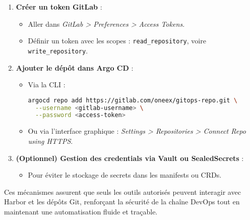 \begin{enumerate}
	\item \textbf{Créer un token GitLab} :
	      \begin{itemize}
		      \item Aller dans \emph{GitLab > Preferences > Access Tokens}.
		      \item Définir un token avec les scopes : \texttt{read\_repository}, voire \texttt{write\_repository}.
	      \end{itemize}


	\item \textbf{Ajouter le dépôt dans Argo CD} :
	      \begin{itemize}
		      \item Via la CLI :
		            \begin{lstlisting}[language=bash]
argocd repo add https://gitlab.com/oneex/gitops-repo.git \
  --username <gitlab-username> \
  --password <access-token>
	      	      \end{lstlisting}
		      \item Ou via l’interface graphique : \emph{Settings > Repositories > Connect Repo using HTTPS}.
	      \end{itemize}


	\item \textbf{(Optionnel) Gestion des credentials via Vault ou SealedSecrets} :
	      \begin{itemize}
		      \item Pour éviter le stockage de secrets dans les manifests ou CRDs.
	      \end{itemize}
\end{enumerate}

\vspace{0.5cm}
Ces mécanismes assurent que seuls les outils autorisés peuvent interagir avec Harbor et les dépôts Git, renforçant la sécurité de la chaîne DevOps tout en maintenant une automatisation fluide et traçable.

